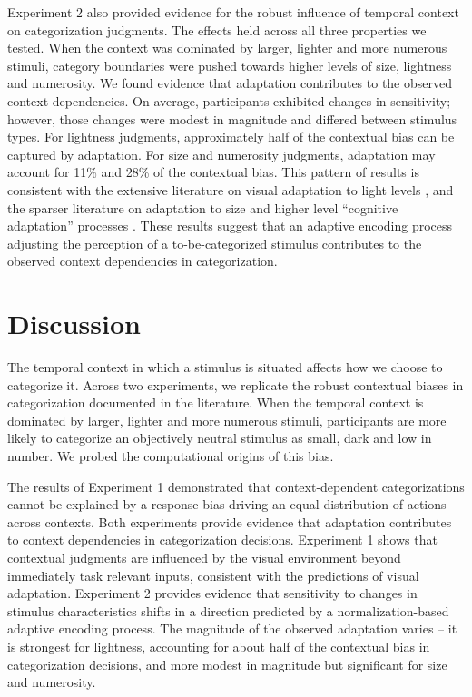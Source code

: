 \documentclass[a4paper, nobind]{templates/ociamthesis}
\begin{document}
Experiment 2 also provided evidence for the robust influence of temporal context on categorization judgments. The effects held across all three properties we tested. When the context was dominated by larger, lighter and more numerous stimuli, category boundaries were pushed towards higher levels of size, lightness and numerosity. We found evidence that adaptation contributes to the observed context dependencies. On average, participants exhibited changes in sensitivity; however, those changes were modest in magnitude and differed between stimulus types. For lightness judgments, approximately half of the contextual bias can be captured by adaptation. For size and numerosity judgments, adaptation may account for 11\% and 28\% of the contextual bias. This pattern of results is consistent with the extensive literature on visual adaptation to light levels \autocite{reuter2011,barlow1972}, and the sparser literature on adaptation to size \autocite{blakemore1969,zimmermann2016} and higher level ``cognitive adaptation'' processes \autocite{palumbo2017a}. These results suggest that an adaptive encoding process adjusting the perception of a to-be-categorized stimulus contributes to the observed context dependencies in categorization.

\hypertarget{discussion-2}{%
\section{Discussion}\label{discussion-2}}

The temporal context in which a stimulus is situated affects how we choose to categorize it. Across two experiments, we replicate the robust contextual biases in categorization documented in the literature. When the temporal context is dominated by larger, lighter and more numerous stimuli, participants are more likely to categorize an objectively neutral stimulus as small, dark and low in number. We probed the computational origins of this bias.

The results of Experiment 1 demonstrated that context-dependent categorizations cannot be explained by a response bias driving an equal distribution of actions across contexts. Both experiments provide evidence that adaptation contributes to context dependencies in categorization decisions. Experiment 1 shows that contextual judgments are influenced by the visual environment beyond immediately task relevant inputs, consistent with the predictions of visual adaptation. Experiment 2 provides evidence that sensitivity to changes in stimulus characteristics shifts in a direction predicted by a normalization-based adaptive encoding process. The magnitude of the observed adaptation varies -- it is strongest for lightness, accounting for about half of the contextual bias in categorization decisions, and more modest in magnitude but significant for size and numerosity.
\end{document}
